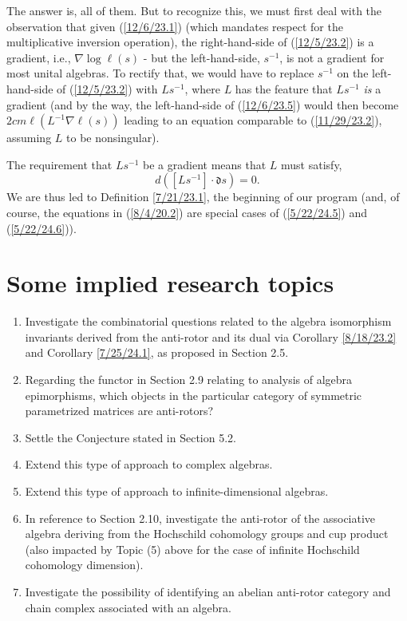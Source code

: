 \documentclass{amsart}
\numberwithin{equation}{section}
\theoremstyle{definition}
\numberwithin{theorem}{section}
\begin{document}
The answer is, all of them.  But to recognize this, we must first deal with the observation that given (\ref{12/6/23.1}) (which mandates respect for the multiplicative inversion operation), the right-hand-side of (\ref{12/5/23.2}) is a gradient, i.e., $\nabla\log \ell(s)$ - but the left-hand-side, $s^{-1}$, is not a gradient for most unital algebras.  
To rectify that, we would have to replace $s^{-1}$ on the left-hand-side of (\ref{12/5/23.2}) with $Ls^{-1}$, where $L$ has the feature that $Ls^{-1}$ {\it is} a gradient (and by the way, the left-hand-side of (\ref{12/6/23.5}) would then become $ {2cm} \ell(L^{-1}\nabla\ell(s))$ leading to an equation comparable to  (\ref{11/29/23.2}), assuming $L$ to be nonsingular).   


The requirement that $Ls^{-1}$ be a gradient means that $L$ must satisfy, \[ d([Ls^{-1}]\cdot \mathfrak{d}s) = 0.\]  We are thus led to Definition \ref{7/21/23.1}, the beginning of our program (and, of course, the equations in (\ref{8/4/20.2}) are special cases of (\ref{5/22/24.5}) and (\ref{5/22/24.6})).

\vspace{.5cm} 

\section{Some implied research topics} 
\begin{enumerate} \item Investigate the combinatorial questions related to the algebra isomorphism invariants derived from the anti-rotor and its dual via Corollary \ref{8/18/23.2} and Corollary \ref{7/25/24.1}, as proposed in Section 2.5.  \item Regarding the functor in Section 2.9 relating to analysis of algebra epimorphisms, which objects in the particular category of symmetric parametrized matrices are anti-rotors? \item Settle the Conjecture stated in Section 5.2. \item Extend this type of approach to complex algebras. \item Extend this type of approach to infinite-dimensional algebras. \item In reference to Section 2.10, investigate the anti-rotor of the associative algebra deriving from the Hochschild cohomology groups and cup product (also impacted by Topic (5) above for the case of infinite Hochschild cohomology dimension).  \item Investigate the possibility of identifying an abelian anti-rotor category and chain complex associated with an algebra.    \end{enumerate}
  
\end{document}
